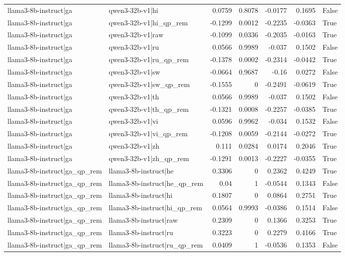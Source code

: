 \begin{table}
\begin{tabular}{l l r r r r l}
llama3-8b-instruct|ga & qwen3-32b-v1|hi & 0.0759 & 0.8078 & -0.0177 & 0.1695 & False \\
llama3-8b-instruct|ga & qwen3-32b-v1|hi_qp_rem & -0.1299 & 0.0012 & -0.2235 & -0.0363 & True \\
llama3-8b-instruct|ga & qwen3-32b-v1|raw & -0.1099 & 0.0336 & -0.2035 & -0.0163 & True \\
llama3-8b-instruct|ga & qwen3-32b-v1|ru & 0.0566 & 0.9989 & -0.037 & 0.1502 & False \\
llama3-8b-instruct|ga & qwen3-32b-v1|ru_qp_rem & -0.1378 & 0.0002 & -0.2314 & -0.0442 & True \\
llama3-8b-instruct|ga & qwen3-32b-v1|sw & -0.0664 & 0.9687 & -0.16 & 0.0272 & False \\
llama3-8b-instruct|ga & qwen3-32b-v1|sw_qp_rem & -0.1555 & 0 & -0.2491 & -0.0619 & True \\
llama3-8b-instruct|ga & qwen3-32b-v1|th & 0.0566 & 0.9989 & -0.037 & 0.1502 & False \\
llama3-8b-instruct|ga & qwen3-32b-v1|th_qp_rem & -0.1321 & 0.0008 & -0.2257 & -0.0385 & True \\
llama3-8b-instruct|ga & qwen3-32b-v1|vi & 0.0596 & 0.9962 & -0.034 & 0.1532 & False \\
llama3-8b-instruct|ga & qwen3-32b-v1|vi_qp_rem & -0.1208 & 0.0059 & -0.2144 & -0.0272 & True \\
llama3-8b-instruct|ga & qwen3-32b-v1|zh & 0.111 & 0.0284 & 0.0174 & 0.2046 & True \\
llama3-8b-instruct|ga & qwen3-32b-v1|zh_qp_rem & -0.1291 & 0.0013 & -0.2227 & -0.0355 & True \\
llama3-8b-instruct|ga_qp_rem & llama3-8b-instruct|he & 0.3306 & 0 & 0.2362 & 0.4249 & True \\
llama3-8b-instruct|ga_qp_rem & llama3-8b-instruct|he_qp_rem & 0.04 & 1 & -0.0544 & 0.1343 & False \\
llama3-8b-instruct|ga_qp_rem & llama3-8b-instruct|hi & 0.1807 & 0 & 0.0864 & 0.2751 & True \\
llama3-8b-instruct|ga_qp_rem & llama3-8b-instruct|hi_qp_rem & 0.0564 & 0.9993 & -0.0386 & 0.1514 & False \\
llama3-8b-instruct|ga_qp_rem & llama3-8b-instruct|raw & 0.2309 & 0 & 0.1366 & 0.3253 & True \\
llama3-8b-instruct|ga_qp_rem & llama3-8b-instruct|ru & 0.3223 & 0 & 0.2279 & 0.4166 & True \\
llama3-8b-instruct|ga_qp_rem & llama3-8b-instruct|ru_qp_rem & 0.0409 & 1 & -0.0536 & 0.1353 & False \\

\end{tabular}
\end{table}
